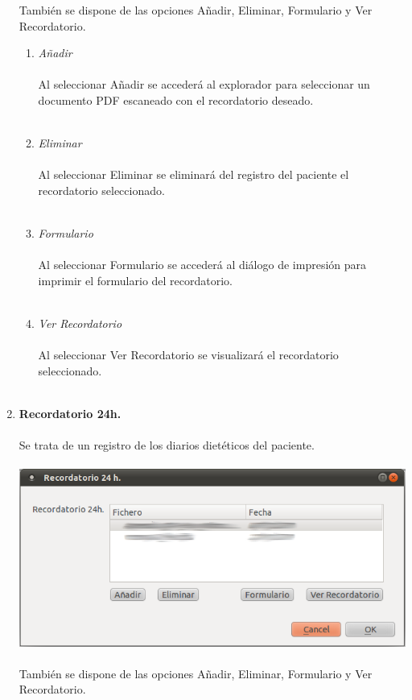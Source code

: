 \documentclass[12pt, spanish]{article}
\begin{document}
\begin{enumerate}
También se dispone de las opciones Añadir, Eliminar, Formulario y Ver Recordatorio.
\begin{enumerate}
\item \textit{Añadir}\\\\
Al seleccionar Añadir se accederá al explorador para seleccionar un documento PDF escaneado con el recordatorio deseado.\\\\
\item \textit{Eliminar}\\\\
Al seleccionar Eliminar se eliminará del registro del paciente el recordatorio seleccionado.\\\\
\item \textit{Formulario}\\\\
Al seleccionar Formulario se accederá al diálogo de impresión para imprimir el formulario del recordatorio.\\\\
\item \textit{Ver Recordatorio}\\\\
Al seleccionar Ver Recordatorio se visualizará el recordatorio seleccionado.\\\\
\end{enumerate}
\item \textbf{Recordatorio 24h.}\\\\
Se trata de un registro de los diarios dietéticos del paciente.\\\\
\includegraphics[scale=0.5]{Image/recordatorio.png}\\\\
También se dispone de las opciones Añadir, Eliminar, Formulario y Ver Recordatorio.

\end{enumerate}
\end{document}
